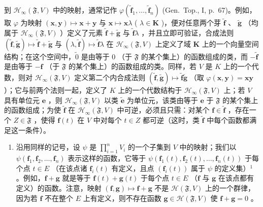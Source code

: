 到 \(\mathcal{H}_{\infty}(\mathfrak{F}, V)\) 中的映射，通常记作 \(\varphi(\tilde{\mathbf{f}}_1, \ldots, \tilde{\mathbf{f}}_n)\) (Gen.~Top., I, p.~67)。例如，取 \(\varphi\) 为映射 \((\mathbf{x}, \mathbf{y}) \mapsto \mathbf{x} + \mathbf{y}\) 与 \(\mathbf{x} \mapsto \mathbf{x}\lambda\) ( \(\lambda \in \mathbf{K}\) )，便对任意两个芽 \(\tilde{\mathbf{f}}\) 、 \(\tilde{\mathbf{g}}\) （均属于 \(\mathcal{H}_{\infty}(\mathfrak{F}, V)\) ）定义了元素 \(\tilde{\mathbf{f}} + \tilde{\mathbf{g}}\) 与 \(\tilde{\mathbf{f}}\lambda\) ，并且立即可验证，合成法则 \((\tilde{\mathbf{f}}, \tilde{\mathbf{g}}) \mapsto \tilde{\mathbf{f}} + \tilde{\mathbf{g}}\) 与 \((\lambda, \tilde{\mathbf{f}}) \mapsto \tilde{\mathbf{f}}\lambda\) 在 \(\mathcal{H}_{\infty}(\mathfrak{F}, V)\) 上定义了域 \(\mathbf{K}\) 上的一个向量空间结构；在这个空间中，\(\tilde{0}\) 是由等于 \(0\) （于 \(\mathfrak{F}\) 的某个集上）的函数组成的类，而 \(-\tilde{\mathbf{f}}\) 是由等于 \(-\mathbf{f}\) （于 \(\mathfrak{F}\) 的某个集上）的函数组成的类。同样，若 \(V\) 是 \(K\) 上的一个代数，则对 \(\mathcal{H}_{\infty}(\mathfrak{F}, V)\) 定义第二个内合成法则 \((\tilde{\mathbf{f}}, \tilde{\mathbf{g}}) \mapsto \tilde{\mathbf{f}}\tilde{\mathbf{g}}\) （取 \(\varphi(\mathbf{x}, \mathbf{y}) = \mathbf{x}\mathbf{y}\) ）；它与前两个法则一起，定义了 \(K\) 上的一个代数结构于 \(\mathcal{H}_{\infty}(\mathfrak{F}, V)\) 上；若 \(V\) 具有单位元 \(\mathbf{e}\) ，则 \(\mathcal{H}_{\infty}(\mathfrak{F}, V)\) 以类 \(\tilde{\mathbf{e}}\) 为单位元，该类由等于 \(\mathbf{e}\) 于 \(\mathfrak{F}\) 的某个集上的函数组成；为使 \(\tilde{\mathbf{f}}\) 在 \(\mathcal{H}_{\infty}(\mathfrak{F}, V)\) 中可逆，必须且只需：对某个 \(\mathbf{f} \in \tilde{\mathbf{f}}\) ，存在一个 \(Z \in \mathfrak{F}\) ，使得 \(\mathbf{f}(t)\) 在 \(V\) 中对每个 \(t \in Z\) 都可逆（这时，类 \(\tilde{\mathbf{f}}\) 中每个函数都满足这一条件）。

\begin{enumerate}
\def\labelenumi{\arabic{enumi})}
\setcounter{enumi}{1}
\tightlist
\item
  沿用同样的记号，设 \(\psi\) 是 \(\prod_{i=1}^{n} V_i\) 的一个子集到 \(V\) 中的映射；我们以 \(\psi(\mathbf{f}_1, \mathbf{f}_2, \ldots, \mathbf{f}_n)\) 表示这样的函数，它等于 \(\psi(\mathbf{f}_1(t), \mathbf{f}_2(t), \ldots, \mathbf{f}_n(t))\) 于每个点 \(t \in E\) （在该点诸 \(\mathbf{f}_i(t)\) 有定义，且点 \((\mathbf{f}_i(t))\) 属于 \(\psi\) 的定义集）\(^1\) 。例如，\(\mathbf{f} + \mathbf{g}\) 就是等于 \(\mathbf{f}(t) + \mathbf{g}(t)\) 于每个点 \(t \in E\) （\(\mathbf{f}\) 与 \(\mathbf{g}\) 在该点都有定义）的函数。注意，映射 \((\mathbf{f}, \mathbf{g}) \mapsto \mathbf{f} + \mathbf{g}\) 不是 \(\mathcal{H}(\mathfrak{F}, V)\) 上的一个群律，因为若 \(\mathbf{f}\) 不在整个 \(E\) 上有定义，则不存在函数 \(\mathbf{g} \in \mathcal{H}(\mathfrak{F}, V)\) 使 \(\mathbf{f} + \mathbf{g} = 0\) 。
\end{enumerate}

